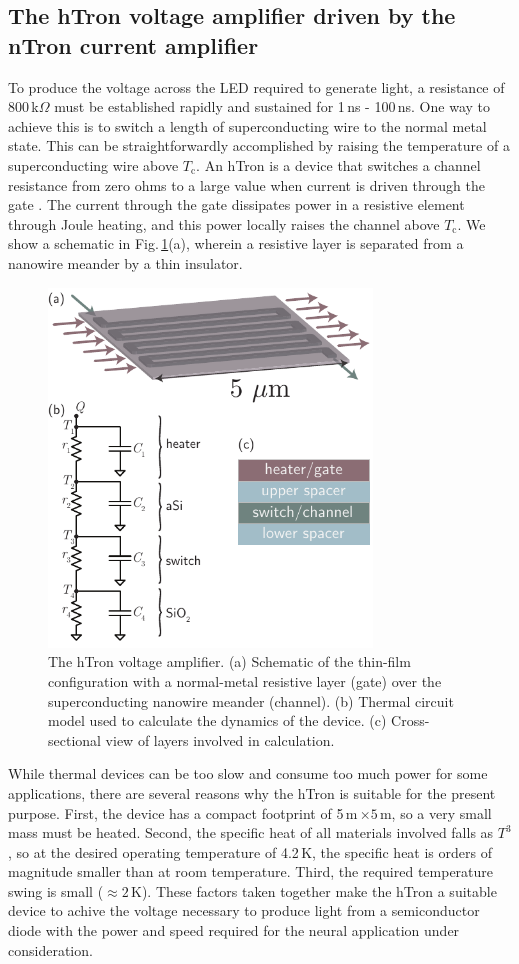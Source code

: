 \documentclass[aip,amsmath,amssymb,reprint,nofootinbib]{revtex4-1}
\begin{document}
\subsection{\label{sec:hTron}The hTron voltage amplifier driven by the nTron current amplifier}
To produce the voltage across the LED required to generate light, a resistance of 800\,k$\Omega$ must be established rapidly and sustained for 1\,ns - 100\,ns. One way to achieve this is to switch a length of superconducting wire to the normal metal state. This can be straightforwardly accomplished by raising the temperature of a superconducting wire above $T_{\mathrm{c}}$. An hTron is a device that switches a channel resistance from zero ohms to a large value when current is driven through the gate \cite{zhto2018}. The current through the gate dissipates power in a resistive element through Joule heating, and this power locally raises the channel above $T_{\mathrm{c}}$. We show a schematic in Fig.\,\ref{fig:transmitters_hTron_circuit}(a), wherein a resistive layer is separated from a nanowire meander by a thin insulator. 
\begin{figure}[t!]
	\centerline{\includegraphics[width=8.6cm]{_transmitters_hTron_circuit_small.pdf}}
	\caption{\label{fig:transmitters_hTron_circuit}The hTron voltage amplifier. (a) Schematic of the thin-film configuration with a normal-metal resistive layer (gate) over the superconducting nanowire meander (channel). (b) Thermal circuit model used to calculate the dynamics of the device. (c) Cross-sectional view of layers involved in calculation.}
\end{figure}

While thermal devices can be too slow and consume too much power for some applications, there are several reasons why the hTron is suitable for the present purpose. First, the device has a compact footprint of 5\,\textmu m\,$\times 5$\,\textmu m, so a very small mass must be heated. Second, the specific heat of all materials involved falls as $T^3$, so at the desired operating temperature of 4.2\,K, the specific heat is orders of magnitude smaller than at room temperature. Third, the required temperature swing is small ($\approx 2$\,K). These factors taken together make the hTron a suitable device to achive the voltage necessary to produce light from a semiconductor diode with the power and speed required for the neural application under consideration.
\end{document}
